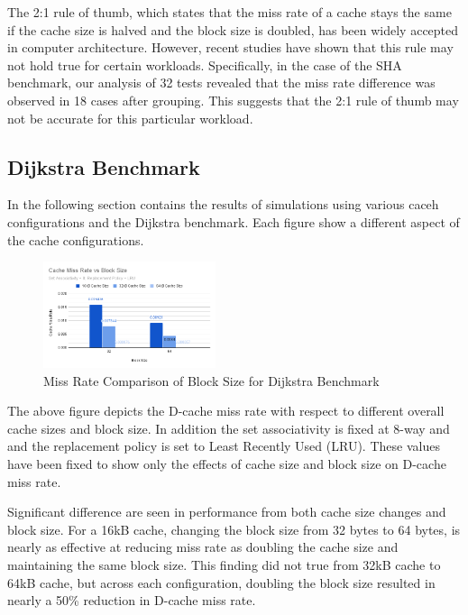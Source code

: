 \documentclass[conference]{IEEEtran}
\begin{document}
The 2:1 rule of thumb, which states that the miss rate of a cache stays the same if the cache size is halved and the block size is doubled, has been widely accepted in computer architecture. However, recent studies have shown that this rule may not hold true for certain workloads. Specifically, in the case of the SHA benchmark, our analysis of 32 tests revealed that the miss rate difference was observed in 18 cases after grouping. This suggests that the 2:1 rule of thumb may not be accurate for this particular workload.


\subsection{Dijkstra Benchmark}

In the following section contains the results of simulations using various caceh configurations and the Dijkstra benchmark. Each figure show a different aspect of the cache configurations.

\begin{figure}[H]
  \centering
  \includegraphics[width=0.45\textwidth]{dijkstraFigures/CacheMissRatevsBlockSize.png}
  \caption{Miss Rate Comparison of Block Size for Dijkstra Benchmark}
  \label{fig:MissRateVsBlockSize}
\end{figure}

The above figure depicts the D-cache miss rate with respect to different overall cache sizes and block size. In addition the set associativity is fixed at 8-way and and the replacement policy is set to Least Recently Used (LRU). These values have been fixed to show only the effects of cache size and block size on D-cache miss rate. 

Significant difference are seen in performance from both cache size changes and block size. For a 16kB cache, changing the block size from 32 bytes to 64 bytes, is nearly as effective at reducing miss rate as doubling the cache size and maintaining the same block size. This finding did not true from 32kB cache to 64kB cache, but across each configuration, doubling the block size resulted in nearly a 50\% reduction in D-cache miss rate.
\end{document}
